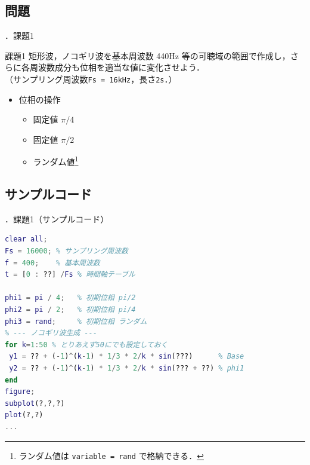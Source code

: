 \documentclass[aspectratio=43]{beamer}
\newcommand{\showsec}{\thesection ．}
\begin{document}
\subsection{問題}
\begin{frame}[t,containsverbatim]{\showsec 課題1}
    \begin{exampleblock}{課題1}
        矩形波，ノコギリ波を基本周波数 440Hz 等の可聴域の範囲で作成し，さらに各周波数成分も位相を適当な値に変化させよう．\\
        （サンプリング周波数\verb|Fs = 16kHz|，長さ\verb|2s|．）
        \begin{itemize}
            \item 位相の操作
                  \begin{itemize}
                      \item 固定値 \(\pi/4\)
                      \item 固定値 \(\pi/2\)
                      \item ランダム値\footnote{ランダム値は \texttt{variable = rand} で格納できる．}
                  \end{itemize}
        \end{itemize}
    \end{exampleblock}
\end{frame}
\subsection{サンプルコード}
\begin{frame}[t,containsverbatim]{\showsec 課題1（サンプルコード）}
    \begin{lstlisting}[language={Matlab}]
clear all;
Fs = 16000; % サンプリング周波数
f = 400;    % 基本周波数
t = [0 : ??] /Fs % 時間軸テーブル

phi1 = pi / 4;   % 初期位相 pi/2
phi2 = pi / 2;   % 初期位相 pi/4
phi3 = rand;     % 初期位相 ランダム
% --- ノコギリ波生成 ---
for k=1:50 % とりあえず50にでも設定しておく
 y1 = ?? + (-1)^(k-1) * 1/3 * 2/k * sin(???)      % Base
 y2 = ?? + (-1)^(k-1) * 1/3 * 2/k * sin(??? + ??) % phi1
end
figure;
subplot(?,?,?)
plot(?,?)
...
\end{lstlisting}
\end{frame}
\end{document}

